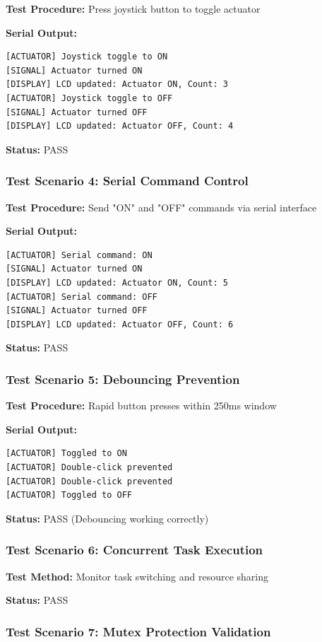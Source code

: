 \documentclass[12pt]{article}
\begin{document}
\textbf{Test Procedure:} Press joystick button to toggle actuator

\textbf{Serial Output:}
\begin{verbatim}
[ACTUATOR] Joystick toggle to ON
[SIGNAL] Actuator turned ON
[DISPLAY] LCD updated: Actuator ON, Count: 3
[ACTUATOR] Joystick toggle to OFF
[SIGNAL] Actuator turned OFF
[DISPLAY] LCD updated: Actuator OFF, Count: 4
\end{verbatim}

\textbf{Status:} PASS

\subsubsection*{Test Scenario 4: Serial Command Control}

\textbf{Test Procedure:} Send "ON" and "OFF" commands via serial interface

\textbf{Serial Output:}
\begin{verbatim}
[ACTUATOR] Serial command: ON
[SIGNAL] Actuator turned ON
[DISPLAY] LCD updated: Actuator ON, Count: 5
[ACTUATOR] Serial command: OFF
[SIGNAL] Actuator turned OFF
[DISPLAY] LCD updated: Actuator OFF, Count: 6
\end{verbatim}

\textbf{Status:} PASS

\subsubsection*{Test Scenario 5: Debouncing Prevention}

\textbf{Test Procedure:} Rapid button presses within 250ms window

\textbf{Serial Output:}
\begin{verbatim}
[ACTUATOR] Toggled to ON
[ACTUATOR] Double-click prevented
[ACTUATOR] Double-click prevented
[ACTUATOR] Toggled to OFF
\end{verbatim}

\textbf{Status:} PASS (Debouncing working correctly)

\subsubsection*{Test Scenario 6: Concurrent Task Execution}

\textbf{Test Method:} Monitor task switching and resource sharing

\textbf{Status:} PASS

\subsubsection*{Test Scenario 7: Mutex Protection Validation}
\end{document}
